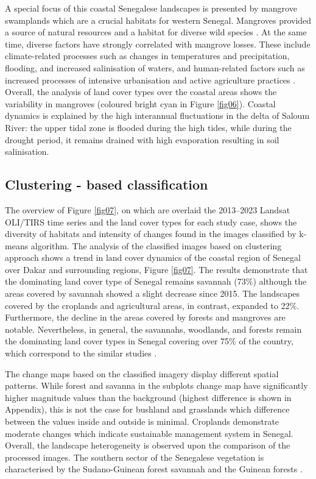 \documentclass[earth,article,submit,pdftex,moreauthors]{Definitions/mdpi}
\begin{document}
A special focus of this {coastal Senegalese landscapes is presented by} mangrove swamplands which are a crucial {habitats} for {western }Senegal{. Mangroves provided }a source of natural resources \cite{Carney} and a habitat for {diverse wild }species \cite{Galat}. At the same time, diverse factors have strongly correlated with mangrove losses. These include climate-related processes such as changes in temperatures and precipitation, flooding, and increased salinisation of waters, and human-related factors such as increased processes of intensive urbanisation \cite{land10100996} and active agriculture practices \cite{Branoff}. Overall, the analysis of land cover types over the coastal areas shows the variability in mangroves (coloured bright cyan in Figure \ref{fig06}){. Coastal dynamics }is explained by the high interannual fluctuations in the delta of Saloum River{:} the upper tidal zone is flooded during the high tides{, while }during the drought period, {it} remains drained with {high evaporation resulting in soil} salinisation. 

\subsection{{Clustering - based classification}}

{The overview of Figure} \ref{fig07}, {on which are overlaid the 2013--2023 Landsat OLI/TIRS time series and the land cover
types for each study case, shows the diversity of habitats and intensity of changes found in the images classified by k-means algorithm.} The analysis of the classified images {based on clustering approach }shows a trend in land cover dynamics of the coastal region of Senegal over Dakar and surrounding regions, Figure \ref{fig07}. The results demonstrate that the dominating land cover type of Senegal {remains} savannah (73\%) although the areas covered by savannah showed a slight decrease since 2015. The landscapes covered by the croplands and agricultural areas, in contrast, expanded to 22\%. Furthermore, the decline in the areas covered by forests and mangroves are notable. Nevertheless, in general, the savannahs, woodlands, and forests remain the dominating land cover types in Senegal covering over 75\% of the country, which correspond to the similar studies \cite{TAPPAN2004427}. 

{The change maps based on the classified imagery display different spatial patterns. While forest and savanna in the subplots change map have significantly higher magnitude values than the background (highest difference is shown in Appendix), this is not the case for bushland and grasslands which difference between the values inside and outside is minimal. Croplands demonstrate moderate changes which indicate sustainable management system in Senegal. Overall, the landscape heterogeneity is observed upon the comparison of the processed images.} The southern sector of the Senegalese vegetation is characterised by the Sudano-Guinean forest savannah and the Guinean forests \cite{Robequain}. 
\end{document}
